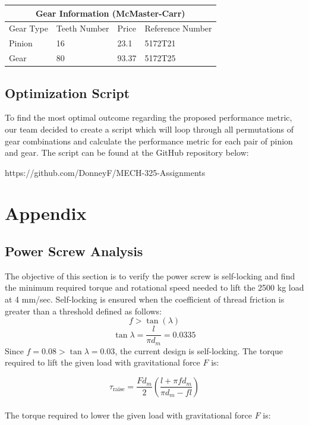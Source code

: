 \documentclass[letterpaper,12pt]{article}
\begin{document}
\begin{center}
	\begin{tabular}{ |p{2cm}||p{3cm}|p{3cm}|p{4cm}|  }
		\hline
		\multicolumn{4}{|c|}{Gear Information (McMaster-Carr)} \\
		\hline
		Gear Type & Teeth Number & Price & Reference Number \\
		\hline
		Pinion & 16 & 23.1 & 5172T21 \\
		Gear & 80 & 93.37 & 5172T25 \\
		\hline
	\end{tabular}
\end{center}


\subsection{Optimization Script}
To find the most optimal outcome regarding the proposed performance metric, our team decided to create a script which will loop through all permutations of gear combinations and calculate the performance metric for each pair of pinion and gear. The script can be found at the GitHub repository below: \\
\begin{center}
    https://github.com/DonneyF/MECH-325-Assignments
\end{center}

\newpage

\section{Appendix}

\subsection{Power Screw Analysis}

The objective of this section is to verify the power screw is self-locking and find the minimum required torque and rotational speed needed to lift the 2500 kg load at 4 mm/sec.
Self-locking is ensured when the coefficient of thread friction is greater than a threshold defined as follows:
\begin{equation}
f > \tan(\lambda)
\end{equation}
$$\tan\lambda = \frac{l}{\pi d_m} = 0.0335$$
Since $f = 0.08 > \tan\lambda = 0.03$, the current design is self-locking. The torque required to lift the given load with gravitational force $F$ is:

\begin{equation}
\tau_{\text{raise}} = \frac{Fd_m}{2}\left(\frac{l+\pi f d_m}{\pi d_m - fl}\right)
\end{equation}
\\
The torque required to lower the given load with gravitational force $F$ is:
\end{document}
